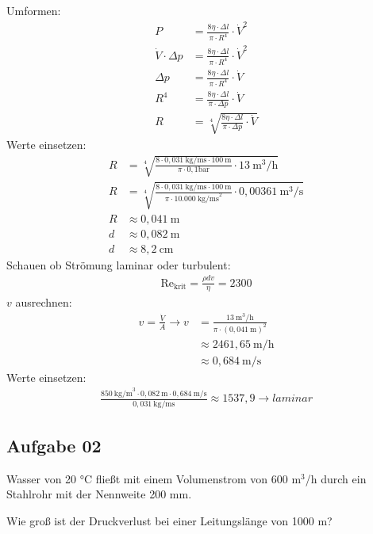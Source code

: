 \documentclass[a4paper,11pt]{article}
\begin{document}
Umformen:
\begin{align*}
P &= \frac{8 \eta \cdot \Delta l}{\pi \cdot R^4} \cdot \dot{V}^2 \\
\dot{V} \cdot \Delta p &=  \frac{8 \eta \cdot \Delta l}{\pi \cdot R^4} \cdot \dot{V}^2 \\
 \Delta p &=  \frac{8 \eta \cdot \Delta l}{\pi \cdot R^4} \cdot \dot{V} \\
R^4 &=  \frac{8 \eta \cdot \Delta l}{\pi \cdot  \Delta p} \cdot \dot{V} \\
R &= \sqrt[4]{\frac{8 \eta \cdot \Delta l}{\pi \cdot  \Delta p} \cdot \dot{V}}
\end{align*}
Werte einsetzen:
\begin{align*}
R &= \sqrt[4]{\frac{8 \cdot 0,031 ~\text{kg/ms} \cdot 100~\text{m}}{\pi \cdot  0,1 \text{bar}} \cdot 13~\text{m}^3/\text{h}} \\
R &= \sqrt[4]{\frac{8 \cdot 0,031 ~\text{kg/ms} \cdot 100~\text{m}}{\pi \cdot  10.000 ~\text{kg/ms}^2} \cdot 0,00361~\text{m}^3/\text{s}}\\
R &\approx 0,041~\text{m} \\
d &\approx 0,082~\text{m} \\
d &\approx 8,2~\text{cm}
\end{align*}
Schauen ob Strömung laminar oder turbulent:
\begin{align*}
\text{Re}_{\text{krit}} = \frac{\rho d v}{\eta} = 2300
\end{align*}
$v$ ausrechnen:
\begin{align*}
v = \frac{\dot{V}}{A} \rightarrow v &= \frac{13~\text{m}^3/\text{h}}{\pi \cdot (0,041~\text{m})^2} \\
&\approx 2461,65~\text{m/h} \\
&\approx 0,684~\text{m/s} 
\end{align*}
Werte einsetzen:
\begin{align*}
\frac{850~\text{kg/m}^3 \cdot 0,082~\text{m} \cdot 0,684~\text{m/s}}{0,031~\text{kg/ms}} \approx 1537,9 \rightarrow {laminar}
\end{align*}



\pagebreak

\subsection*{Aufgabe 02}
Wasser von 20 °C fließt mit einem Volumenstrom von 600 m$^3$/h durch ein Stahlrohr mit der Nennweite 200 mm. \par 
Wie groß ist der Druckverlust bei einer Leitungslänge von 1000 m?
\end{document}
